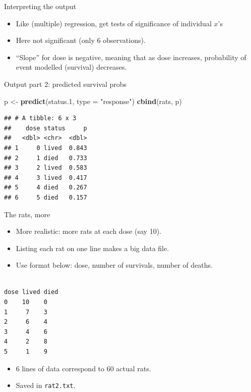 \documentclass[
  ignorenonframetext,
]{beamer}
\newenvironment{Shaded}{\begin{snugshade}}{\end{snugshade}}
\newcommand{\DataTypeTok}[1]{\textcolor[rgb]{0.13,0.29,0.53}{#1}}
\newcommand{\FloatTok}[1]{\textcolor[rgb]{0.00,0.00,0.81}{#1}}
\newcommand{\KeywordTok}[1]{\textcolor[rgb]{0.13,0.29,0.53}{\textbf{#1}}}
\newcommand{\NormalTok}[1]{#1}
\newcommand{\StringTok}[1]{\textcolor[rgb]{0.31,0.60,0.02}{#1}}
\begin{document}
\begin{frame}{Interpreting the output}
\protect\hypertarget{interpreting-the-output}{}

\begin{itemize}
\item
  Like (multiple) regression, get tests of significance of individual
  \(x\)'s
\item
  Here not significant (only 6 observations).
\item
  ``Slope'' for dose is negative, meaning that as dose increases,
  probability of event modelled (survival) decreases.
\end{itemize}

\end{frame}

\begin{frame}[fragile]{Output part 2: predicted survival probs}
\protect\hypertarget{output-part-2-predicted-survival-probs}{}

\begin{Shaded}
\begin{Highlighting}[]
\NormalTok{p <-}\StringTok{ }\KeywordTok{predict}\NormalTok{(status}\FloatTok{.1}\NormalTok{, }\DataTypeTok{type =} \StringTok{"response"}\NormalTok{)}
\KeywordTok{cbind}\NormalTok{(rats, p)}
\end{Highlighting}
\end{Shaded}

\begin{verbatim}
## # A tibble: 6 x 3
##    dose status     p
##   <dbl> <chr>  <dbl>
## 1     0 lived  0.843
## 2     1 died   0.733
## 3     2 lived  0.583
## 4     3 lived  0.417
## 5     4 died   0.267
## 6     5 died   0.157
\end{verbatim}

\end{frame}

\begin{frame}[fragile]{The rats, more}
\protect\hypertarget{the-rats-more}{}

\begin{itemize}
\item
  More realistic: more rats at each dose (say 10).
\item
  Listing each rat on one line makes a big data file.
\item
  Use format below: dose, number of survivals, number of deaths.
\end{itemize}

\begin{verbatim}

dose lived died
0    10    0
1     7    3 
2     6    4 
3     4    6 
4     2    8 
5     1    9  
\end{verbatim}

\begin{itemize}
\item
  6 lines of data correspond to 60 actual rats.
\item
  Saved in \texttt{rat2.txt}.
\end{itemize}

\end{frame}
\end{document}
